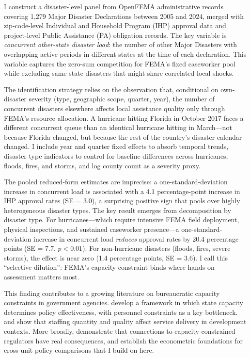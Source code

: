 \documentclass[12pt]{article}
\begin{document}
I construct a disaster-level panel from OpenFEMA administrative records covering 1,279 Major Disaster Declarations between 2005 and 2024, merged with zip-code-level Individual and Household Program (IHP) approval data and project-level Public Assistance (PA) obligation records. The key variable is \textit{concurrent other-state disaster load}: the number of other Major Disasters with overlapping active periods in different states at the time of each declaration. This variable captures the zero-sum competition for FEMA's fixed caseworker pool while excluding same-state disasters that might share correlated local shocks.

The identification strategy relies on the observation that, conditional on own-disaster severity (type, geographic scope, quarter, year), the number of concurrent disasters elsewhere affects local assistance quality only through FEMA's resource allocation. A hurricane hitting Florida in October 2017 faces a different concurrent queue than an identical hurricane hitting in March---not because Florida changed, but because the rest of the country's disaster calendar changed. I include year and quarter fixed effects to absorb temporal trends, disaster type indicators to control for baseline differences across hurricanes, floods, fires, and storms, and log county count as a severity proxy.

The pooled reduced-form estimates are imprecise: a one-standard-deviation increase in concurrent load is associated with a 4.1 percentage-point increase in IHP approval rates (SE = 3.0), a surprising positive sign that pools over highly heterogeneous disaster types. The key result emerges from decomposition by disaster type. For hurricanes---which require intensive FEMA field deployment, physical inspections, and sustained caseworker presence---a one-standard-deviation increase in concurrent load \textit{reduces} approval rates by 20.4 percentage points (SE = 7.7, $p < 0.01$). For non-hurricane disasters (floods, fires, severe storms), the effect is near zero (1.4 percentage points, SE = 3.6). I call this ``selective dilution'': FEMA's capacity constraint binds where hands-on assessment matters most.

This finding contributes to a growing literature on bureaucratic capacity constraints in government agencies. \citet{besley2022} develop a framework in which state capacity determines policy effectiveness, with personnel constraints as a key bottleneck. \citet{deserranno2019} and \citet{dalpont2023} show that staffing quantity and quality affect service delivery in development contexts. More broadly, \citet{fisman2015} demonstrate that connections to capacity-constrained regulators have real consequences, and \citet{bertrand2003} establish the econometric foundations for cross-unit policy comparisons that I build on here.
\end{document}

